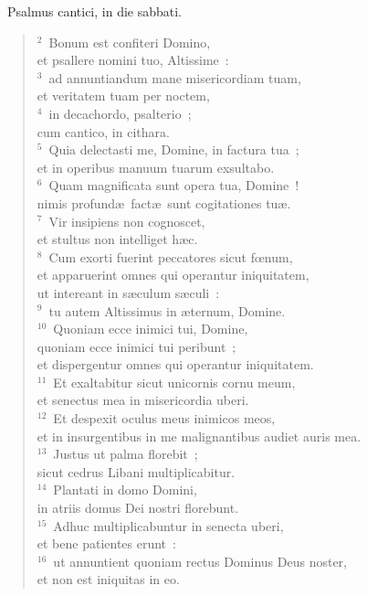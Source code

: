 ~\lettrine[lines=10,image=true,loversize=0.05,lraise=-0.03]{P}{}salmus cantici, in die sabbati.
\begin{flushleft}\begin{verse}\vspace{6pt}${}^{2}$~Bonum est confiteri Domino,\\ et psallere nomini tuo, Altissime~:\\
${}^{3}$~ad annuntiandum mane misericordiam tuam,\\ et veritatem tuam per noctem,\\
${}^{4}$~in decachordo, psalterio~;\\ cum cantico, in cithara.\\
${}^{5}$~Quia delectasti me, Domine, in factura tua~;\\ et in operibus manuum tuarum exsultabo.\\
${}^{6}$~Quam magnificata sunt opera tua, Domine~!\\ nimis profund\ae\ fact\ae\ sunt cogitationes tu\ae .\\
${}^{7}$~Vir insipiens non cognoscet,\\ et stultus non intelliget h\ae c.\\
${}^{8}$~Cum exorti fuerint peccatores sicut fœnum,\\ et apparuerint omnes qui operantur iniquitatem,\\ ut intereant in s\ae culum s\ae culi~:\\
${}^{9}$~tu autem Altissimus in \ae ternum, Domine.\\
${}^{10}$~Quoniam ecce inimici tui, Domine,\\ quoniam ecce inimici tui peribunt~;\\ et dispergentur omnes qui operantur iniquitatem.\\
${}^{11}$~Et exaltabitur sicut unicornis cornu meum,\\ et senectus mea in misericordia uberi.\\
${}^{12}$~Et despexit oculus meus inimicos meos,\\ et in insurgentibus in me malignantibus audiet auris mea.\\
${}^{13}$~Justus ut palma florebit~;\\ sicut cedrus Libani multiplicabitur.\\
${}^{14}$~Plantati in domo Domini,\\ in atriis domus Dei nostri florebunt.\\
${}^{15}$~Adhuc multiplicabuntur in senecta uberi,\\ et bene patientes erunt~:\\
${}^{16}$~ut annuntient quoniam rectus Dominus Deus noster,\\ et non est iniquitas in eo.\end{verse}\end{flushleft}


